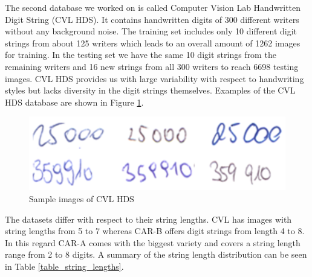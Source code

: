 The second database we worked on is called Computer Vision Lab Handwritten Digit String (CVL HDS). It contains handwritten digits of 300 different writers without any background noise. The training set includes only 10 different digit strings from about 125 writers which leads to an overall amount of 1262 images for training. In the testing set we have the same 10 digit strings from the remaining writers and 16 new strings from all 300 writers to reach 6698 testing images. CVL HDS provides us with large variability with respect to handwriting styles but lacks diversity in the digit strings themselves. Examples of the CVL HDS database are shown in Figure \ref{fig:cvl}.

\begin{figure}
  \includegraphics[width=\linewidth]{images/CVL-HDS-Splitted.png}
  \caption{Sample images of CVL HDS}
  \label{fig:cvl}
\end{figure}

The datasets differ with respect to their string lengths. CVL has images with string lengths from 5 to 7 whereas CAR-B offers digit strings from length 4 to 8. In this regard CAR-A comes with the biggest variety and covers a string length range from 2 to 8 digits. A summary of the string length distribution can be seen in Table \ref{table_string_lengths}.


